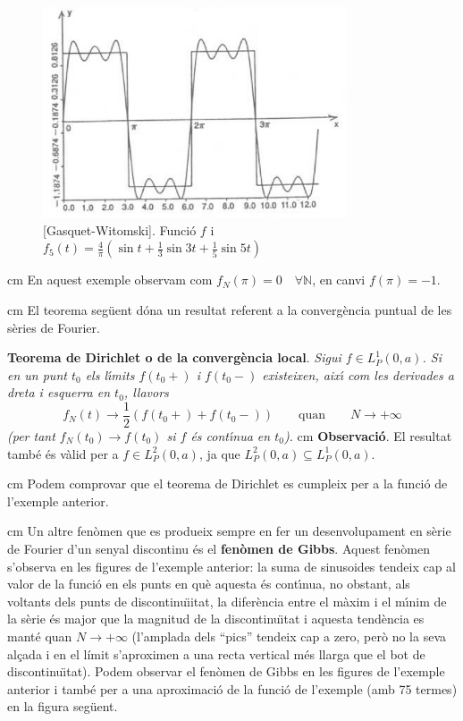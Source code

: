 \documentclass{article}
\def\N{\mathbb N}
\begin{document}
\begin{figure}
\begin{center}
\includegraphics[width=9cm]{imatges/exserie3.eps}
\caption{[Gasquet-Witomski]. Funci\'o $f$ i
$f_5(t)=\frac{4}{\pi} (\sin t + \frac{1}{3} \sin 3t + \frac{1}{5} \sin 5t)$}
\end{center}
\end{figure}

 cm
En aquest exemple observam com $f_N(\pi)=0 \quad \forall \N$, en canvi
$f(\pi)=-1$.

 cm
El teorema seg\"uent d\'ona un resultat referent a la converg\`encia puntual
de les s\`eries de Fourier.

\noindent
\textbf{Teorema de Dirichlet o de la converg\`encia local}.{\it
Sigui $f \in L^1_P(0, a)$. Si en un punt $t_0$ els l\'\i mits 
$f(t_0+)$ i $f(t_0-)$ existeixen, aix\'\i $ $ com les derivades a dreta
i esquerra en $t_0$, llavors
\[
f_N(t) \longrightarrow \frac{1}{2} (f(t_0+)+f(t_0-)) \qquad \mathrm{quan}
\qquad N \rightarrow +\infty
\]
\noindent
(per tant $f_N(t_0) \rightarrow f(t_0)$ si $f$ \'es cont\'\i nua en $t_0$). 
}
 cm
\noindent
\textbf{Observaci\'o}. El resultat tamb\'e \'es v\`alid per a 
$f \in L^2_P(0, a)$, ja que $L^2_P(0, a) \subseteq L^1_P(0, a)$. 

 cm
\noindent
Podem comprovar que el teorema de Dirichlet es cumpleix per a la funci\'o
de l'exemple anterior.

 cm
\noindent
Un altre fen\`omen que es produeix sempre en fer un desenvolupament 
en s\`erie de Fourier d'un senyal discontinu \'es el {\bf fen\`omen de Gibbs}.
Aquest fen\`omen s'observa en les figures de l'exemple anterior: la suma de
sinusoides tendeix cap al valor de la funci\'o en els punts en qu\`e aquesta
\'es cont\'\i nua, no obstant, als voltants dels punts de discontinu\"\i itat,
la difer\`encia entre el m\`axim i el m\'\i nim de la s\`erie \'es major que
la magnitud de la discontinu\"\i tat i aquesta tend\`encia es mant\'e quan
$N \rightarrow +\infty$ (l'amplada dels ``pics'' tendeix cap a zero, per\`o
no la seva al\c{c}ada i en el l\'imit s'aproximen
a una recta vertical m\'es llarga que el bot de discontinu\"\i tat). 
\newline
Podem observar el fen\`omen de Gibbs en les figures de l'exemple anterior
i tamb\'e per a una aproximaci\'o de la funci\'o de l'exemple (amb 75 termes)
en la figura seg\"uent.
\end{document}
